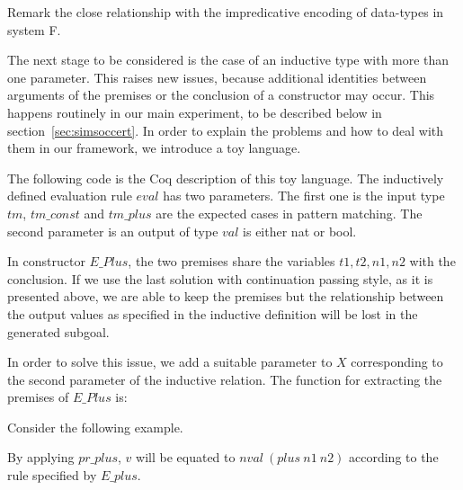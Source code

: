 
\noindent
Remark the close relationship with the impredicative encoding
of data-types in system F.



The next stage to be considered is the case of
an inductive type with more than one parameter.
This raises new issues, because additional identities
between arguments of the premises or the conclusion
of a constructor may occur.
This happens routinely in our main experiment,
to be described below in section~\ref{sec:simsoccert}.
In order to explain the problems and how to deal with
them in our framework, 
we introduce a toy language.


The following code is the Coq description of this toy language.
The inductively defined evaluation rule $eval$ has two parameters.
The first one is the input type $tm$, $tm\_const$ and $tm\_plus$ are the
expected cases in pattern matching.
The second parameter is an output of type $val$ is either nat or bool.

\medskip
{}
\medskip

In constructor $E\_Plus$,
the two premises share the variables $t1, t2, n1, n2$ with the
conclusion. 
If we use the last solution 
with continuation passing style, as it is presented above,
we are able to keep the premises 
but the relationship between the output values
as specified in the inductive definition will be lost
in the generated subgoal.

In order to solve this issue,
we add a suitable parameter to $X$ 
corresponding to the second parameter of the inductive relation.
The function for extracting the premises of $E\_Plus$ is:

\medskip
{}
\medskip

Consider the following example.

\medskip
{}
\medskip

By applying $pr\_plus$, $v$ will be equated to $nval~(plus~n1~n2)$ 
according to the rule specified by $E\_plus$.



